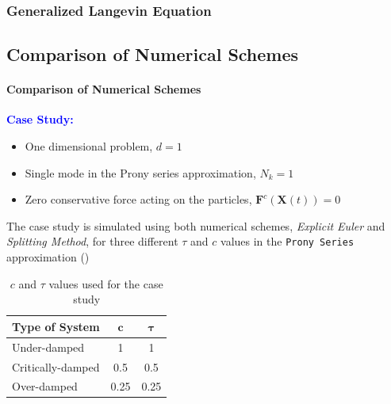 \documentclass[a4paper,10pt]{beamer}
\newcommand{\BS}[1]{\boldsymbol{#1}}
\newcommand{\rb}[1]{\left( #1 \right)}
\begin{document}
	\begin{frame}
		\frametitle{Generalized Langevin Equation}
		\subsection{Comparison of Numerical Schemes}
		\framesubtitle{Comparison of Numerical Schemes}
		\textcolor{blue}{\textbf{Case Study:}}
		\begin{itemize}
			\item {One dimensional problem, $d = 1$}
			\item {Single mode in the Prony series approximation, $N_{k} = 1$}
			\item {Zero conservative force acting on the particles, $\BS{F}^{c}\rb{\BS{X}(t)} = 0$}
		\end{itemize}
		The case study is simulated using both numerical schemes, \textit{Explicit Euler} and \textit{Splitting Method}, for three different $\tau$ and $c$ values in the \texttt{Prony Series} approximation ()
		\begin{table}[H]
			\begin{tabular}{| p{2.6cm} | c | c |}
				\hline
				\textbf{Type of System} & $\BS{c}$ & $\BS{\tau}$ \\
				\hline
				Under-damped & 1 & 1 \\
				Critically-damped & 0.5 & 0.5 \\
				Over-damped & 0.25 & 0.25 \\
				\hline
			\end{tabular}
			\caption{$c$ and $\tau$ values used for the case study}
			\label{tab:cTauBaseCase}
		\end{table}
	\end{frame}
\end{document}
